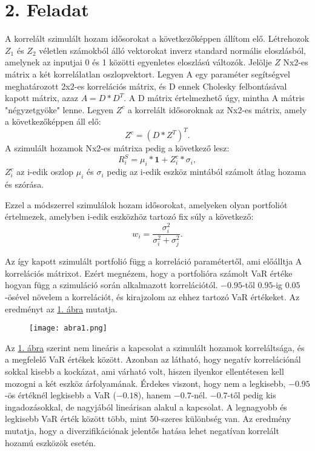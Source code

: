 \documentclass[a4paper,12pt]{article}
\begin{document}
\section{2. Feladat}
A korrelált szimulált hozam idősorokat a következőképpen állítom elő. 
Létrehozok $Z_1$ és $Z_2$ véletlen számokból álló vektorokat inverz standard normális eloszlásból, amelynek az inputjai 0 és 1 közötti egyenletes eloszlású változók.
Jelölje $Z$ Nx2-es mátrix a két korrelálatlan oszlopvektort. 
Legyen A egy paraméter segítségvel meghatározott 2x2-es korrelációs mátrix, és D ennek Cholesky felbontásával kapott mátrix, azaz $A=D*D^T$. 
A D mátrix értelmezhető úgy, mintha A mátris "négyzetgyöke" lenne. 
Legyen $Z^c$ a korrelált idősoroknak az Nx2-es mátrix, amely a következőképpen áll elő:
\begin{equation}
Z^c=(D*Z^T)^T. 
\end{equation}
A szimulált hozamok Nx2-es mátrixa pedig a következő lesz:
\begin{equation}
R_i^S = \mu_i*\mathbf{1} +Z_i^c * \sigma_i, 
\end{equation}
$Z_i^c$ az i-edik oszlop $\mu_i$ és $\sigma_i$ pedig az i-edik eszköz mintából számolt átlag hozama és szórása. 

Ezzel a módszerrel szimulálok hozam idősorokat, amelyeken olyan portfoliót értelmezek, amelyben i-edik eszközhöz tartozó fix súly a következő: 
\begin{equation}
w_i=\frac{\sigma_i^2}{\sigma_i^2 +\sigma_j^2}. 
\end{equation}

Az így kapott szimulált portfolió függ a korreláció paramétertől, ami előálltja A korrelációs mátrixot. 
Ezért megnézem, hogy a portfolióra számolt VaR értéke hogyan függ a szimuláció során alkalmazott korrelációtól. 
$-0.95$-től $0.95$-ig $0.05$-ösével növelem a korrelációt, és kirajzolom az ehhez tartozó VaR értékeket. 
Az eredményt az \hyperref[fig:fig1]{1. ábra} mutatja. 
\begin{figure}[H]
\caption{}
        \centering
        \texttt{[image: abra1.png]}
\label{fig:fig1}
\end{figure}

Az \hyperref[fig:fig1]{1. ábra} szerint nem lineáris a kapcsolat a szimulált hozamok korreláltsága, és a megfelelő VaR értékek között. 
Azonban az látható, hogy negatív korrelációnál sokkal kisebb a kockázat, ami várható volt, hiszen ilyenkor ellentétesen kell mozogni a két eszköz árfolyamának. 
Érdekes viszont, hogy nem a legkisebb, $-0.95$-ös értéknél legkisebb a VaR ($-0.18$), hanem $-0.7$-nél. 
$-0.7$-től pedig kis ingadozásokkal, de nagyjából lineárisan alakul a kapcsolat. 
A legnagyobb és legkisebb VaR érték között több, mint 50-szeres különbség van. 
Az eredmény mutatja, hogy a diverzifikációnak jelentős hatása lehet negatívan korrelált hozamú eszközök esetén. 
\end{document}
